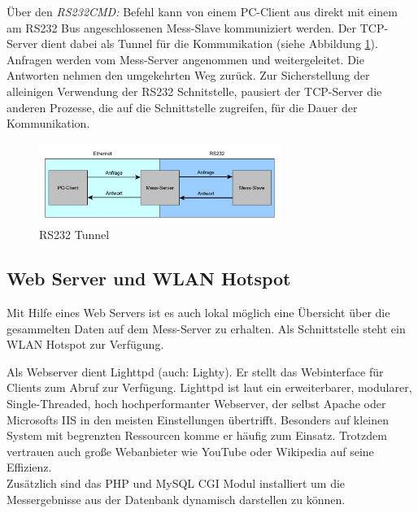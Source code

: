 Über den \textit{RS232CMD:} Befehl kann von einem PC-Client aus direkt mit einem am RS232 Bus angeschlossenen Mess-Slave kommuniziert werden. Der TCP-Server dient dabei als Tunnel für die Kommunikation (siehe Abbildung \ref{figure_RS232Tunnel}). Anfragen werden vom Mess-Server angenommen und weitergeleitet. Die Antworten nehmen den umgekehrten Weg zurück. Zur Sicherstellung der alleinigen Verwendung der RS232 Schnitstelle, pausiert der TCP-Server die anderen Prozesse, die auf die Schnittstelle zugreifen, für die Dauer der Kommunikation.\ 


\begin{figure}[H]
\begin{center}
\includegraphics[width=0.7\textwidth ]{img/general/RS232Tunnel.pdf}
\caption{RS232 Tunnel}
\label{figure_RS232Tunnel}
\end{center}
\end{figure}


\subsection{Web Server und WLAN Hotspot}
\label{section_WebServerWLANHotspot}

Mit Hilfe eines Web Servers ist es auch lokal möglich eine Übersicht über die gesammelten Daten auf dem Mess-Server zu erhalten. Als Schnittstelle steht ein WLAN Hotspot zur Verfügung.\ 

Als Webserver dient Lighttpd (auch: Lighty). Er stellt das Webinterface für Clients zum Abruf zur Verfügung. Lighttpd ist laut \cite{bogus2008lighttpd} ein erweiterbarer, modularer, Single-Threaded, hoch hochperformanter Webserver, der selbst Apache oder Microsofts IIS in den meisten Einstellungen übertrifft. Besonders auf kleinen System mit begrenzten Ressourcen komme er häufig zum Einsatz. Trotzdem vertrauen auch große Webanbieter wie YouTube oder Wikipedia auf seine Effizienz.\\
Zusätzlich sind das PHP und MySQL \ac{CGI} Modul installiert um die Messergebnisse aus der Datenbank dynamisch darstellen zu können. 

